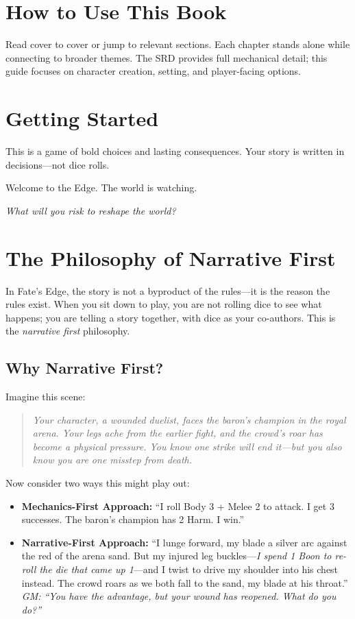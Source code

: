 \section*{How to Use This Book}

Read cover to cover or jump to relevant sections. Each chapter stands alone while connecting to broader themes. The SRD provides full mechanical detail; this guide focuses on character creation, setting, and player-facing options.

\section*{Getting Started}

This is a game of bold choices and lasting consequences. Your story is written in decisions---not dice rolls.

Welcome to the Edge. The world is watching.

\begin{center}
\emph{What will you risk to reshape the world?}
\end{center}

\section{The Philosophy of Narrative First}
\label{sec:narrative-first}

In Fate's Edge, the story is not a byproduct of the rules---it is the reason the rules exist. When you sit down to play, you are not rolling dice to see what happens; you are telling a story together, with dice as your co-authors. This is the \textit{narrative first} philosophy.

\subsection{Why Narrative First?}

Imagine this scene:

\begin{quote}
\itshape Your character, a wounded duelist, faces the baron's champion in the royal arena. Your legs ache from the earlier fight, and the crowd's roar has become a physical pressure. You know one strike will end it---but you also know you are one misstep from death.
\end{quote}

Now consider two ways this might play out:

\begin{itemize}
\item \textbf{Mechanics-First Approach:} ``I roll Body 3 + Melee 2 to attack. I get 3 successes. The baron's champion has 2 Harm. I win.''

\item \textbf{Narrative-First Approach:} ``I lunge forward, my blade a silver arc against the red of the arena sand. But my injured leg buckles---\textit{I spend 1 Boon to re-roll the die that came up 1}---and I twist to drive my shoulder into his chest instead. The crowd roars as we both fall to the sand, my blade at his throat.''  
\emph{GM: ``You have the advantage, but your wound has reopened. What do you do?''}
\end{itemize}

